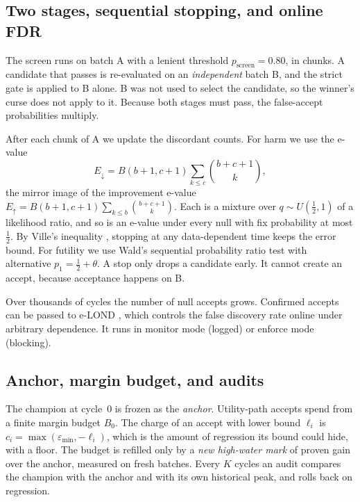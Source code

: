 \documentclass[11pt]{article}
\begin{document}
\subsection{Two stages, sequential stopping, and online FDR}
\label{sec:two}

The screen runs on batch A with a lenient threshold $p_{\mathrm{screen}}=0.80$, in chunks. A candidate that passes is re-evaluated on an \emph{independent} batch B, and the strict gate is applied to B alone.
B was not used to select the candidate, so the winner's curse does not apply to it. Because both stages must pass, the false-accept probabilities multiply.

After each chunk of A we update the discordant counts. For harm we use the e-value
\[
E_{\downarrow}=B(b{+}1,c{+}1)\sum_{k\le c}\binom{b+c+1}{k},
\]
the mirror image of the improvement e-value $E_{\uparrow}=B(b{+}1,c{+}1)\sum_{k\le b}\binom{b+c+1}{k}$. Each is a mixture over $q\sim U(\tfrac12,1)$ of a likelihood ratio, and so is an e-value under every null with fix probability at most $\tfrac12$.
By Ville's inequality \citep{ramdas2023gtsavi}, stopping at any data-dependent time keeps the error bound. For futility we use Wald's sequential probability ratio test \citep{wald1945sprt} with alternative $p_1=\tfrac12+\theta$.
A stop only drops a candidate early. It cannot create an accept, because acceptance happens on B.

Over thousands of cycles the number of null accepts grows. Confirmed accepts can be passed to e-LOND \citep{xu2024elond}, which controls the false discovery rate online under arbitrary dependence. It runs in monitor mode (logged) or enforce mode (blocking).

\subsection{Anchor, margin budget, and audits}
\label{sec:budget}

The champion at cycle~0 is frozen as the \emph{anchor}. Utility-path accepts spend from a finite margin budget $B_0$. The charge of an accept with lower bound $\ell_i$ is $c_i=\max(\varepsilon_{\min},-\ell_i)$, which is the amount of regression its bound could hide, with a floor.
The budget is refilled only by a \emph{new high-water mark} of proven gain over the anchor, measured on fresh batches. Every $K$ cycles an audit compares the champion with the anchor and with its own historical peak, and rolls back on regression.
\end{document}
